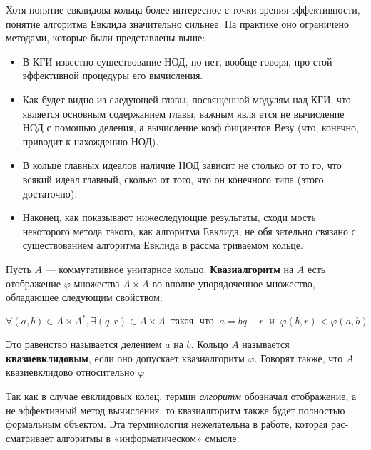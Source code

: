 \documentclass{mai_book}
\begin{document}
Хотя понятие евклидова кольца более интересное с точки зрения
эффективности, понятие алгоритма Евклида значительно сильнее. На
практике оно ограничено методами, которые были представлены выше:
\begin{itemize}


\item В КГИ известно существование НОД, но нет, вообще говоря, про­
стой эффективной процедуры его вычисления.

\item Как будет видно из следующей главы, посвященной модулям над
КГИ, что является основным содержанием главы, важным явля­
ется не вычисление НОД с помощью деления, а вычисление коэф­
фициентов Везу (что, конечно, приводит к нахождению НОД).

\item В кольце главных идеалов наличие НОД зависит не столько от то­
го, что всякий идеал главный, сколько от того, что он конечного
типа (этого достаточно).
\newpage %
\item Наконец, как показывают нижеследующие результаты, сходи­
мость некоторого метода такого, как алгоритма Евклида, не обя­
зательно связано с существованием алгоритма Евклида в рассма­
триваемом кольце.
\end{itemize}
\begin{determ}
\hspace*{0.5cm}
Пусть $A$ — коммутативное унитарное кольцо. \textbf{Квазиалгоритм} на $A$ есть отображение $\varphi$ множества $A\times A$ во вполне упорядоченное множество, обладающее следующим свойством:
\begin{center}
$\forall(a,b)\in A\times A^*, \exists(q,r)\in A\times A\;\;\text{такая, что}\;\;a = bq + r\;\;\text{и}\;\;\varphi(b,r)<\varphi(a,b)$
\end{center}
Это равенство называется делением $a$ на $b$. Кольцо $A$ называется \textbf{квазиевклидовым}, если оно допускает квазиалгоритм $\varphi$. Говорят также, что $A$ квазиевклидово относительно $\varphi$
\end{determ}
\begin{note}
Так как в случае евклидовых колец, термин \textit{алгоритм} обозначал отображение, а не эффективный метод вычисления, то квазиалгоритм также будет полностью формальным объектом. Эта терминология нежелательна в работе, которая рас­сматривает алгоритмы в «информатическом» смысле.
\end{note}
\end{document}
